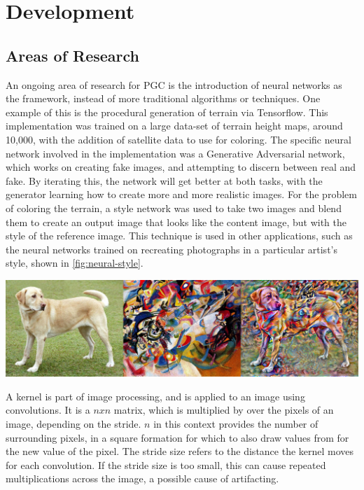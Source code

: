 \documentclass[10pt]{report}
\begin{document}
	\vspace{10pt}
	\let\clearpage\relax
	\chapter{Development}

		\section{Areas of Research}
	
		An ongoing area of research for PGC is the introduction of neural networks as the framework, instead of more traditional algorithms or techniques. One example of this is the procedural generation of terrain via Tensorflow. This implementation was trained on a large data-set of terrain height maps, around 10,000, with the addition of satellite data to use for coloring. The specific neural network involved in the implementation was a Generative Adversarial network, which works on creating fake images, and attempting to discern between real and fake. By iterating this, the network will get better at both tasks, with the generator learning how to create more and more realistic images. For the problem of coloring the terrain, a style network was used to take two images and blend them to create an output image that looks like the content image, but with the style of the reference image. This technique is used in other applications, such as the neural networks trained on recreating photographs in a particular artist's style, shown in \autoref{fig:neural-style}. 
		
		\begin{minipage}{\textwidth}
			\centering
			\includegraphics[scale=.3]{stylized-image}
			\label{fig:neural-style}
		\end{minipage}
	
		A kernel is part of image processing, and is applied to an image using convolutions. It is a \(n x n\) matrix, which is multiplied by over the pixels of an image, depending on the stride. \(n\) in this context provides the number of surrounding pixels, in a square formation for which to also draw values from for the new value of the pixel. The stride size refers to the distance the kernel moves for each convolution. If the stride size is too small, this can cause repeated multiplications across the image, a possible cause of artifacting. 
	
\end{document}
